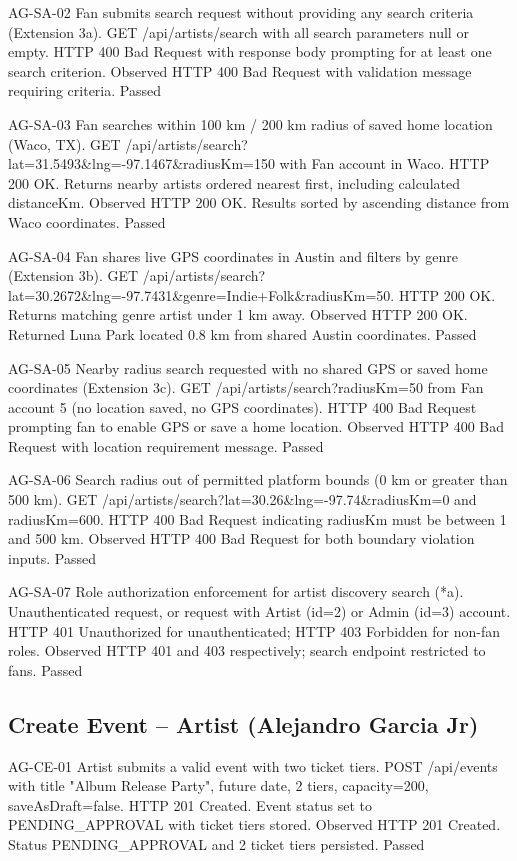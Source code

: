 \documentclass[11pt]{report}
\begin{document}
\alextestcase
{AG-SA-02}
{Fan submits search request without providing any search criteria (Extension 3a).}
{GET /api/artists/search with all search parameters null or empty.}
{HTTP 400 Bad Request with response body prompting for at least one search criterion.}
{Observed HTTP 400 Bad Request with validation message requiring criteria.}
{Passed}

\clearpage
\alextestcase
{AG-SA-03}
{Fan searches within 100 km / 200 km radius of saved home location (Waco, TX).}
{GET /api/artists/search?lat=31.5493\&lng=-97.1467\&radiusKm=150 with Fan account in Waco.}
{HTTP 200 OK. Returns nearby artists ordered nearest first, including calculated distanceKm.}
{Observed HTTP 200 OK. Results sorted by ascending distance from Waco coordinates.}
{Passed}

\alextestcase
{AG-SA-04}
{Fan shares live GPS coordinates in Austin and filters by genre (Extension 3b).}
{GET /api/artists/search?lat=30.2672\&lng=-97.7431\&genre=Indie+Folk\&radiusKm=50.}
{HTTP 200 OK. Returns matching genre artist under 1 km away.}
{Observed HTTP 200 OK. Returned Luna Park located 0.8 km from shared Austin coordinates.}
{Passed}

\clearpage
\alextestcase
{AG-SA-05}
{Nearby radius search requested with no shared GPS or saved home coordinates (Extension 3c).}
{GET /api/artists/search?radiusKm=50 from Fan account 5 (no location saved, no GPS coordinates).}
{HTTP 400 Bad Request prompting fan to enable GPS or save a home location.}
{Observed HTTP 400 Bad Request with location requirement message.}
{Passed}

\alextestcase
{AG-SA-06}
{Search radius out of permitted platform bounds (0 km or greater than 500 km).}
{GET /api/artists/search?lat=30.26\&lng=-97.74\&radiusKm=0 and radiusKm=600.}
{HTTP 400 Bad Request indicating radiusKm must be between 1 and 500 km.}
{Observed HTTP 400 Bad Request for both boundary violation inputs.}
{Passed}

\clearpage
\alextestcase
{AG-SA-07}
{Role authorization enforcement for artist discovery search (*a).}
{Unauthenticated request, or request with Artist (id=2) or Admin (id=3) account.}
{HTTP 401 Unauthorized for unauthenticated; HTTP 403 Forbidden for non-fan roles.}
{Observed HTTP 401 and 403 respectively; search endpoint restricted to fans.}
{Passed}

\subsection*{Create Event -- Artist (Alejandro Garcia Jr)}
\alextestcase
{AG-CE-01}
{Artist submits a valid event with two ticket tiers.}
{POST /api/events with title "Album Release Party", future date, 2 tiers, capacity=200, saveAsDraft=false.}
{HTTP 201 Created. Event status set to PENDING\_APPROVAL with ticket tiers stored.}
{Observed HTTP 201 Created. Status PENDING\_APPROVAL and 2 ticket tiers persisted.}
{Passed}
\end{document}
